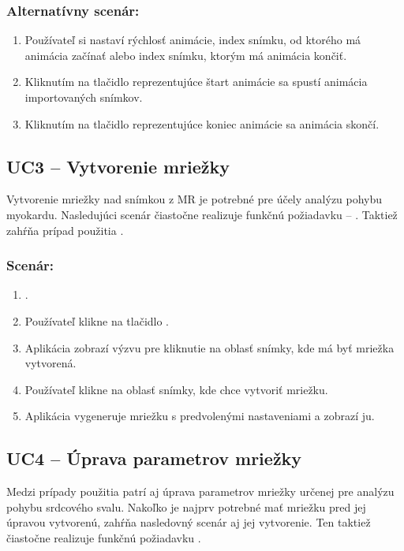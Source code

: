 \subsubsection*{Alternatívny scenár:}
\begin {enumerate}
\item [\textbf{2.}] {Používateľ si nastaví rýchlosť animácie, index snímku, od ktorého má animácia začínať alebo index snímku, ktorým má animácia končiť.}
\item  [\textbf{3.}] {Kliknutím na tlačidlo reprezentujúce štart animácie sa spustí animácia importovaných snímkov.}
\item  [\textbf{4.}] {Kliknutím na tlačidlo reprezentujúce koniec animácie sa animácia skončí.}
\end {enumerate}

\subsection {UC3 -- Vytvorenie mriežky}\label{uc3}
Vytvorenie mriežky nad snímkou z MR je potrebné pre účely analýzu pohybu myokardu. Nasledujúci scenár čiastočne realizuje funkčnú požiadavku -- . Taktiež zahŕňa prípad použitia .

\subsubsection*{Scenár:}
\begin {enumerate}
\item {.}
\item {Používateľ klikne na tlačidlo .}
\item {Aplikácia zobrazí výzvu pre kliknutie na oblasť snímky, kde má byť mriežka vytvorená.}
\item {Používateľ klikne na oblasť snímky, kde chce vytvoriť mriežku.}
\item {Aplikácia vygeneruje mriežku s predvolenými nastaveniami a zobrazí ju.}
\end {enumerate}

\subsection {UC4 -- Úprava parametrov mriežky}\label{uc4}
Medzi prípady použitia patrí aj úprava parametrov mriežky určenej pre analýzu pohybu srdcového svalu. Nakoľko je najprv potrebné mať mriežku  pred jej úpravou vytvorenú, zahŕňa nasledovný scenár aj jej vytvorenie. Ten taktiež čiastočne realizuje funkčnú požiadavku .

